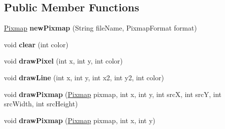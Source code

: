\subsection*{Public Member Functions}
\begin{DoxyCompactItemize}
\item 
\hypertarget{interfacecom_1_1github_1_1walterfan_1_1gtd_1_1game_1_1Graphics_a5328d32702e71c7df9eccbfd566af568}{\hyperlink{classcom_1_1github_1_1walterfan_1_1gtd_1_1game_1_1Pixmap}{Pixmap} {\bfseries new\-Pixmap} (String file\-Name, Pixmap\-Format format)}\label{interfacecom_1_1github_1_1walterfan_1_1gtd_1_1game_1_1Graphics_a5328d32702e71c7df9eccbfd566af568}

\item 
\hypertarget{interfacecom_1_1github_1_1walterfan_1_1gtd_1_1game_1_1Graphics_aeda24d42918552fcf74a6be60e21a00b}{void {\bfseries clear} (int color)}\label{interfacecom_1_1github_1_1walterfan_1_1gtd_1_1game_1_1Graphics_aeda24d42918552fcf74a6be60e21a00b}

\item 
\hypertarget{interfacecom_1_1github_1_1walterfan_1_1gtd_1_1game_1_1Graphics_a51e0a788d789bf8875fbb3c382a67f25}{void {\bfseries draw\-Pixel} (int x, int y, int color)}\label{interfacecom_1_1github_1_1walterfan_1_1gtd_1_1game_1_1Graphics_a51e0a788d789bf8875fbb3c382a67f25}

\item 
\hypertarget{interfacecom_1_1github_1_1walterfan_1_1gtd_1_1game_1_1Graphics_ad3bc85395db83245035bb9da48d16b8d}{void {\bfseries draw\-Line} (int x, int y, int x2, int y2, int color)}\label{interfacecom_1_1github_1_1walterfan_1_1gtd_1_1game_1_1Graphics_ad3bc85395db83245035bb9da48d16b8d}

\item 
\hypertarget{interfacecom_1_1github_1_1walterfan_1_1gtd_1_1game_1_1Graphics_a8bd41dcc61d0d80cfca38f05cdf69b57}{void {\bfseries draw\-Pixmap} (\hyperlink{classcom_1_1github_1_1walterfan_1_1gtd_1_1game_1_1Pixmap}{Pixmap} pixmap, int x, int y, int src\-X, int src\-Y, int src\-Width, int src\-Height)}\label{interfacecom_1_1github_1_1walterfan_1_1gtd_1_1game_1_1Graphics_a8bd41dcc61d0d80cfca38f05cdf69b57}

\item 
\hypertarget{interfacecom_1_1github_1_1walterfan_1_1gtd_1_1game_1_1Graphics_aa1b1152158a4a3001417c7ec0bf298b3}{void {\bfseries draw\-Pixmap} (\hyperlink{classcom_1_1github_1_1walterfan_1_1gtd_1_1game_1_1Pixmap}{Pixmap} pixmap, int x, int y)}\label{interfacecom_1_1github_1_1walterfan_1_1gtd_1_1game_1_1Graphics_aa1b1152158a4a3001417c7ec0bf298b3}


\end{DoxyCompactItemize}
